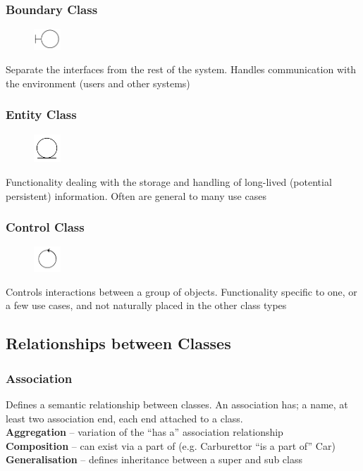\documentclass[10pt,a4paper]{article}
\begin{document}
\begin{landscape}
\begin{multicols}{3}
\subsubsection{Boundary Class}
\begin{figure}
    \includegraphics[width=0.09\textwidth]{BoundaryClass}
\end{figure}
Separate the interfaces from the rest of the system. Handles communication with the environment (users and other systems)
\subsubsection{Entity Class}
\begin{figure}
    \includegraphics[width=0.09\textwidth]{EntityClass}
\end{figure}
Functionality dealing with the storage and handling of long-lived (potential persistent) information. Often are general to many use cases
\subsubsection{Control Class}
\begin{figure}
    \includegraphics[width=0.09\textwidth]{ControlClass}
\end{figure}
Controls interactions between a group of objects. Functionality specific to one, or a few use cases, and not naturally placed in the other class types
\subsection{Relationships between Classes}
\subsubsection{Association}
Defines a semantic relationship between classes. An association has; a name, at least two association end, each end attached to a class.\\
\textbf{Aggregation} -- variation of the ``has a'' association relationship\\
\textbf{Composition} -- can exist via a part of (e.g. Carburettor ``is a part of'' Car)\\
\textbf{Generalisation} -- defines inheritance between a super and sub class


\end{multicols}
\end{landscape}
\end{document}
